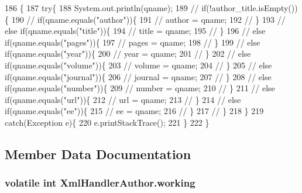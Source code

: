 \begin{DoxyCode}
186                                                                                                            
               \{
187         \textcolor{keywordflow}{try}\{
188             System.out.println(qname);
189             \textcolor{comment}{// if(!author\_title.isEmpty())\{}
190             \textcolor{comment}{//  if(qname.equals("author"))\{}
191             \textcolor{comment}{//      author = qname;}
192             \textcolor{comment}{//  \}}
193             \textcolor{comment}{//  else if(qname.equals("title"))\{}
194             \textcolor{comment}{//      title = qname;}
195             \textcolor{comment}{//  \}}
196             \textcolor{comment}{//  else if(qname.equals("pages"))\{}
197             \textcolor{comment}{//      pages = qname;}
198             \textcolor{comment}{//  \}}
199             \textcolor{comment}{//  else if(qname.equals("year"))\{}
200             \textcolor{comment}{//      year = qname;}
201             \textcolor{comment}{//  \}}
202             \textcolor{comment}{//  else if(qname.equals("volume"))\{}
203             \textcolor{comment}{//      volume = qname;}
204             \textcolor{comment}{//  \}}
205             \textcolor{comment}{//  else if(qname.equals("journal"))\{}
206             \textcolor{comment}{//      journal = qname;}
207             \textcolor{comment}{//  \}}
208             \textcolor{comment}{//  else if(qname.equals("number"))\{}
209             \textcolor{comment}{//      number = qname;}
210             \textcolor{comment}{//  \}}
211             \textcolor{comment}{//  else if(qname.equals("url"))\{}
212             \textcolor{comment}{//      url = qname;}
213             \textcolor{comment}{//  \}}
214             \textcolor{comment}{//  else if(qname.equals("ee"))\{}
215             \textcolor{comment}{//      ee = qname;}
216             \textcolor{comment}{//  \}}
217             \textcolor{comment}{// \}}
218         \}
219         \textcolor{keywordflow}{catch}(Exception e)\{
220             e.printStackTrace();
221         \}
222     \}
\end{DoxyCode}


\subsection{Member Data Documentation}
\hypertarget{classXmlHandlerAuthor_a3b5ed01d09eb68532c727613932065a8}{
\subsubsection[{working}]{\setlength{\rightskip}{0pt plus 5cm}volatile int Xml\-Handler\-Author.\-working}}\label{classXmlHandlerAuthor_a3b5ed01d09eb68532c727613932065a8}



